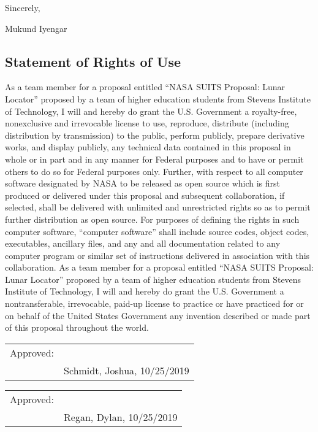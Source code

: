 \documentclass{article}
\let\Oldsubsection\subsection
\renewcommand{\subsection}{\FloatBarrier\Oldsubsection}
\newcommand{\maintitle}{NASA SUITS Proposal: Lunar Locator}
\newcommand{\schoolname}{Stevens Institute of Technology}
\begin{document}
Sincerely,

Mukund Iyengar

\newpage

\subsection{Statement of Rights of Use}

{
As a team member for a proposal entitled “\maintitle” proposed by a team of higher education students from \schoolname, I will and hereby do grant the U.S. Government a royalty-free, nonexclusive and irrevocable license to use, reproduce, distribute (including distribution by transmission) to the public, perform publicly, prepare derivative works, and display publicly, any technical data contained in this proposal in whole or in part and in any manner for Federal purposes and to have or permit others to do so for Federal purposes only. Further, with respect to all computer software designated by NASA to be released as open source which is first produced or delivered under this proposal and subsequent collaboration, if selected, shall be delivered with unlimited and unrestricted rights so as to permit further distribution as open source. For purposes of defining the rights in such computer software, “computer software” shall include source codes, object codes, executables, ancillary files, and any and all documentation related to any computer program or similar set of instructions delivered in association with this collaboration. As a team member for a proposal entitled “\maintitle” proposed by a team of higher education students from \schoolname, I will and hereby do grant the U.S. Government a nontransferable, irrevocable, paid-up license to practice or have practiced for or on behalf of the United States Government any invention described or made part of this proposal throughout the world.
}

\bigskip
\bigskip

\begin{tabular}{@{}p{.5in}p{3.5in}@{}}
Approved: & \hrulefill \\
& Schmidt, Joshua, 10/25/2019\\
\end{tabular}

\bigskip
\bigskip

\begin{tabular}{@{}p{.5in}p{3.5in}@{}}
Approved: & \hrulefill \\
& Regan, Dylan, 10/25/2019\\
\end{tabular}
\end{document}
